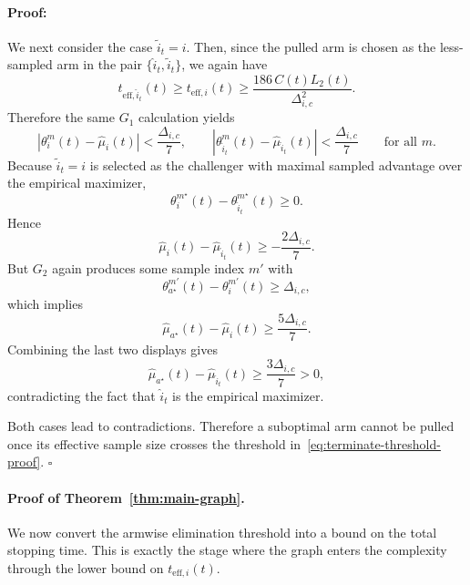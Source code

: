 \documentclass{article}
\newenvironment{proof}{\paragraph{Proof:}}{\hfill$\square$}
\begin{document}
\begin{proof}
We next consider the case $\widetilde i_t=i$. Then, since the pulled arm is chosen as the less-sampled arm in the pair $\{\widehat i_t,\widetilde i_t\}$, we again have
\[
t_{\mathrm{eff},\widehat i_t}(t)
\ge
 t_{\mathrm{eff},i}(t)
\ge
\frac{186\,C(t)L_2(t)}{\Delta_{i,c}^2}.
\]
Therefore the same $G_1$ calculation yields
\[
|\theta_i^m(t)-\widehat\mu_i(t)|<\frac{\Delta_{i,c}}{7},
\qquad
|\theta_{\widehat i_t}^m(t)-\widehat\mu_{\widehat i_t}(t)|<\frac{\Delta_{i,c}}{7}
\qquad
\text{for all }m.
\]
Because $\widetilde i_t=i$ is selected as the challenger with maximal sampled advantage over the empirical maximizer,
\[
\theta_i^{m^\star}(t)-\theta_{\widehat i_t}^{m^\star}(t)\ge 0.
\]
Hence
\[
\widehat\mu_i(t)-\widehat\mu_{\widehat i_t}(t)
\ge
-\frac{2\Delta_{i,c}}{7}.
\]
But $G_2$ again produces some sample index $m'$ with
\[
\theta_{a^\star}^{m'}(t)-\theta_i^{m'}(t)\ge \Delta_{i,c},
\]
which implies
\[
\widehat\mu_{a^\star}(t)-\widehat\mu_i(t)
\ge
\frac{5\Delta_{i,c}}{7}.
\]
Combining the last two displays gives
\[
\widehat\mu_{a^\star}(t)-\widehat\mu_{\widehat i_t}(t)
\ge
\frac{3\Delta_{i,c}}{7}
>
0,
\]
contradicting the fact that $\widehat i_t$ is the empirical maximizer.

Both cases lead to contradictions. Therefore a suboptimal arm cannot be pulled once its effective sample size crosses the threshold in~\eqref{eq:terminate-threshold-proof}.
\end{proof}

\paragraph{Proof of Theorem~\ref{thm:main-graph}.}
We now convert the armwise elimination threshold into a bound on the total stopping time. This is exactly the stage where the graph enters the complexity through the lower bound on $t_{\mathrm{eff},i}(t)$.
\end{document}
